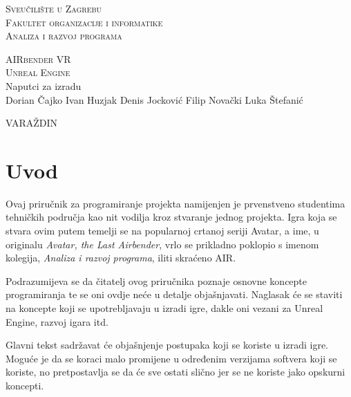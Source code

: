 \documentclass[a4paper,10pt]{article}
\begin{document}
\begin{center}
\textsc{Sveučilište u Zagrebu}\\
\textsc{Fakultet organizacije i informatike}\\
\textsc{Analiza i razvoj programa}
\end{center}
\vspace*{7cm}
\begin{center}
	\textsc{\huge AIRbender VR}\\
	\textsc{\large Unreal Engine}\\Naputci za izradu\\
	\vspace*{1cm}
	Dorian Čajko \quad Ivan Huzjak \quad Denis Jocković \quad  Filip
	Novački \quad Luka Štefanić
\end{center}
\hspace*{1cm}

\begin{center}\end{center}
\vspace*{7cm}

\begin{center}
VARA\v{Z}DIN
\end{center}

\pagebreak

\pagestyle{fancy}
\tableofcontents

\pagebreak
{}

\section*{Uvod}

Ovaj priručnik za programiranje projekta namijenjen je prvenstveno studentima
tehničkih područja kao nit vodilja kroz stvaranje jednog projekta. Igra koja se
stvara ovim putem temelji se na popularnoj crtanoj seriji Avatar, a ime, u
originalu \textit{Avatar, the Last Airbender}, vrlo se prikladno poklopio s
imenom kolegija, \textit{Analiza i razvoj programa}, iliti skraćeno
AIR.

Podrazumijeva se da čitatelj ovog priručnika poznaje osnovne koncepte
programiranja te se oni ovdje neće u detalje objašnjavati. Naglasak će se
staviti na koncepte koji se upotrebljavaju u izradi igre, dakle oni vezani za
Unreal Engine, razvoj igara itd.

\marginpar{\color{blue}{Dodatna objašnjenja mogu se vidjeti izdvojena sa strane
kako bi se dodatno povezalo objašnjeno s drugim konceptima.}}
Glavni tekst sadržavat će objašnjenje postupaka koji se koriste u izradi igre.
Moguće je da se koraci malo promijene u određenim verzijama softvera koji se
koriste, no pretpostavlja se da će sve ostati slično jer se ne koriste jako
opskurni koncepti.
\end{document}
